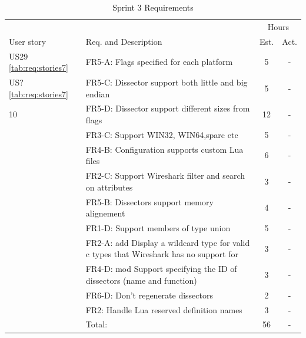 \begin{table}[!htb] \small \center
\caption{Sprint 3 Requirements \label{tab:sprint3req}}
\begin{tabularx}{\textwidth}{l X c c}
	\toprule
	& & \multicolumn{2}{c}{Hours} \\
	\cmidrule(r){4-5}
	User story & Req. and Description & Est. & Act. \\
	\midrule
	US29 \ref{tab:req:stories7} & FR5-A: Flags specified for each platform &  5  & - \\
	US?\ref{tab:req:stories7} & FR5-C: Dissector support both little and big endian & 5  & - \\
	10 & FR5-D: Dissector support different sizes from flags & 12  & - \\
	 & FR3-C: Support WIN32, WIN64,sparc etc &  5  & - \\
	 & FR4-B: Configuration supports custom Lua files & 6 & -\\
	 & FR2-C: Support Wireshark filter and search on attributes &  3 & -\\
	 & FR5-B: Dissectors support memory alignement & 4 & -\\
	 & FR1-D: Support members of type union & 5  & -\\
	 & FR2-A: add Display a wildcard type for valid c types that Wireshark has no support for & 3  & - \\
	 & FR4-D: mod Support specifying the ID of dissectors (name and function) & 3  & - \\
	 & FR6-D: Don’t regenerate dissectors & 2 & - \\
	 & FR2: Handle Lua reserved definition names & 3 & - \\
	\midrule
	& Total: & 56 &  -\\
	\bottomrule
\end{tabularx}
\end{table}


